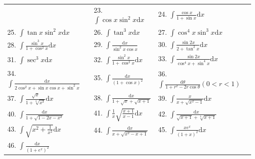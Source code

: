 \begin{center}
\begin{tabular}{l l l}
    & 23. $\displaystyle \int \cos x \sin^2 x \mathrm{d}x$
    & 24. $\displaystyle \int \frac{\cos x}{1 + \sin x} \mathrm{d}x$\\
    25. $\displaystyle \int \tan x \sin^2 x \mathrm{d}x$
    & 26. $\displaystyle \int \tan^3 x \mathrm{d}x$
    & 27. $\displaystyle \int \cos^4 x \sin^3 x \mathrm{d}x$\\
    28. $\displaystyle \int \frac{\sin^3 x}{1 + \cos^2 x} \mathrm{d}x$
    & 29. $\displaystyle \int \frac{\mathrm{d}x}{\sin^2 x \cos x}$
    & 30. $\displaystyle \int \frac{\sin 2x}{2 + \tan^2 x} \mathrm{d}x$\\
    31. $\displaystyle \int \sec^3 x \mathrm{d}x$
    & 32. $\displaystyle \int \frac{\sin^2 x}{1 + \cos^2 x} \mathrm{d}x$
    & 33. $\displaystyle \int \frac{\sin 2x}{\cos^4 x + \sin^4 x} \mathrm{d}x$\\
    34. $\displaystyle \int \frac{\mathrm{d}x}{2 \cos^2 x + \sin x \cos x + \sin^2 x}$
    & 35. $\displaystyle \int \frac{\mathrm{d}x}{(1 + \cos x)^2}$
    & 36. $\displaystyle \int \frac{\mathrm{d}\theta}{1 + r^2 - 2r\cos\theta} (0< r< 1)$\\
    37. $\displaystyle \int \frac{\sqrt{x}}{1 + \sqrt[4]{x^3}} \mathrm{d}x$
    & 38. $\displaystyle \int \frac{\mathrm{d}x}{1 + \sqrt{x} + \sqrt{x + 1}}$
    & 39. $\displaystyle \int \frac{x}{x + \sqrt{x^2 - 1}} \mathrm{d}x$\\
    40. $\displaystyle \int \frac{\mathrm{d}x}{1 + \sqrt{1 - 2x - x^2}}$
    & 41. $\displaystyle \int \frac{1}{x}\sqrt{\frac{x + 1}{x - 1}} \mathrm{d}x$
    & 42. $\displaystyle \int \frac{\mathrm{d}x}{\sqrt{x + 1} + \sqrt[3]{x + 1}}$\\
    43. $\displaystyle \int \sqrt{x^2 + \frac{1}{x^2}} \mathrm{d}x$
    & 44. $\displaystyle \int \frac{\mathrm{d}x}{x + \sqrt{x^2 - x + 1}}$
    & 45. $\displaystyle \int \frac{xe^x}{(1 + x)^2} \mathrm{d}x$\\
    46. $\displaystyle \int \frac{\mathrm{d}x}{(1 + e^x)^2}$ &  &
\end{tabular}
\end{center}
